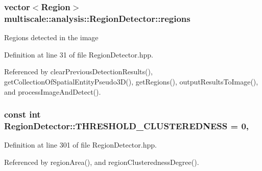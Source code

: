 \hypertarget{classmultiscale_1_1analysis_1_1RegionDetector_aa6517ceb3a58295448d32e6e41499893}{
\subsubsection[{regions}]{\setlength{\rightskip}{0pt plus 5cm}vector$<${\bf Region}$>$ multiscale\-::analysis\-::\-Region\-Detector\-::regions\hspace{0.3cm}{\ttfamily [private]}}}\label{classmultiscale_1_1analysis_1_1RegionDetector_aa6517ceb3a58295448d32e6e41499893}
Regions detected in the image 

Definition at line 31 of file Region\-Detector.\-hpp.



Referenced by clear\-Previous\-Detection\-Results(), get\-Collection\-Of\-Spatial\-Entity\-Pseudo3\-D(), get\-Regions(), output\-Results\-To\-Image(), and process\-Image\-And\-Detect().

\hypertarget{classmultiscale_1_1analysis_1_1RegionDetector_a52778f49510e1e500b2dc48857724e20}{
\subsubsection[{T\-H\-R\-E\-S\-H\-O\-L\-D\-\_\-\-C\-L\-U\-S\-T\-E\-R\-E\-D\-N\-E\-S\-S}]{\setlength{\rightskip}{0pt plus 5cm}const int Region\-Detector\-::\-T\-H\-R\-E\-S\-H\-O\-L\-D\-\_\-\-C\-L\-U\-S\-T\-E\-R\-E\-D\-N\-E\-S\-S = 0\hspace{0.3cm}{\ttfamily [static]}, {\ttfamily [private]}}}\label{classmultiscale_1_1analysis_1_1RegionDetector_a52778f49510e1e500b2dc48857724e20}


Definition at line 301 of file Region\-Detector.\-hpp.



Referenced by region\-Area(), and region\-Clusteredness\-Degree().

